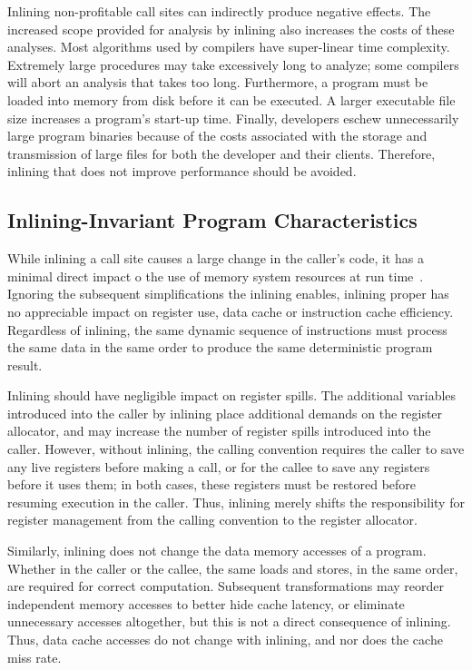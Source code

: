 Inlining non-profitable call sites can indirectly produce negative effects.  The increased scope provided for analysis by inlining also increases the costs of these analyses.  Most algorithms used by compilers have super-linear time complexity.  Extremely large procedures may take excessively long to analyze; some compilers will abort an analysis that takes too long.  Furthermore, a program must be loaded into memory from disk before it can be executed.  A larger executable file size increases a program's start-up time.  Finally, developers eschew unnecessarily large program binaries because of the costs associated with the storage and transmission of large files for both the developer and their clients. Therefore, inlining that does not improve performance should be avoided.

\subsection{Inlining-Invariant Program Characteristics}

While inlining a call site causes a large change in the caller's code, it has a minimal direct impact o the use of memory system resources at run time~\cite{BerubePhD}.  Ignoring the subsequent simplifications the inlining enables, inlining proper has no appreciable impact on register use, data cache or instruction cache efficiency.  Regardless of inlining, the same dynamic sequence of instructions must process the same data in the same order to produce the same deterministic program result.

Inlining should have negligible impact on register spills. The additional variables introduced into the caller by inlining place additional demands on the register allocator, and may increase the number of register spills introduced into the caller.  However, without inlining, the calling convention requires the caller to save any live registers before making a call, or for the callee to save any registers before it uses them; in both cases, these registers must be restored before resuming execution in the caller. Thus, inlining merely shifts the responsibility for register management from the calling convention to the register allocator.

Similarly, inlining does not change the data memory accesses of a program.  Whether in the caller or the callee, the same loads and stores, in the same order, are required for correct computation. Subsequent transformations may reorder independent memory accesses to better hide cache latency, or eliminate unnecessary accesses altogether, but this is not a direct consequence of inlining.  Thus, data cache accesses do not change with inlining, and nor does the cache miss rate.  

